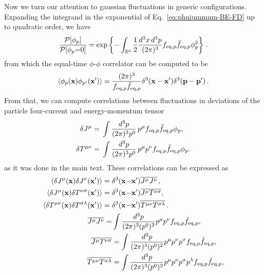 \documentclass[aps,prd,preprint,nofootinbib,amsmath,amssymb,showpacs,longbibliography,singlecolumn,superscriptaddress,10pt]{revtex4-1}
\theoremstyle{plain}
\theoremstyle{definition}
\begin{document}
Now we turn our attention to gaussian fluctuations in generic configurations. Expanding the integrand in the exponential of Eq.~\eqref{eq:phuiummum-BE-FD} up to quadratic order, we have
%
\begin{equation}
\label{eq:gavagringoGauss-FD-BE}    
\begin{aligned}
  \dfrac{\mathcal{P}[\phi_p]}{\mathcal{P}[\phi_p{=}0]} = \exp \left\{ -\int_{\mathbb{R}^6}  \dfrac{1}{2}\dfrac{d^3 x \, d^3p}{(2\pi)^3} f_{\text{eq},p} \Tilde{f}_{\text{eq},p}  \phi^2_p \right\} \, .
\end{aligned}
\end{equation}
%
from which the equal-time $\phi$-$\phi$ correlator can be computed to be
%
\begin{equation}
\label{eq:equaltimecorreltor!}
    \langle \phi_p(\textbf{x})\phi_{p'}(\textbf{x}')\rangle = \dfrac{(2\pi)^3}{f_{\text{eq},p}\Tilde{f}_{\text{eq},p}} \delta^3(\textbf{x}-\textbf{x}')\delta^3(\textbf{p}-\textbf{p}') \, .
\end{equation}
%
From that, we can compute correlations between fluctuations in deviations of the particle four-current and energy-momentum tensor 
%
\begin{equation}
\label{eq:ThedefinitionsFluttuanti-FD-BE}
\begin{split}
    \delta J^{\mu} ={}& \int \frac{d^3p}{(2\pi)^3 p^0} \, p^{\mu} f_{\text{eq},p} \Tilde{f}_{\text{eq},p}\phi_p ,\\
    \delta T^{\mu\nu} ={}& \int \frac{d^3p}{(2\pi)^3 p^0} \, p^{\mu} p^{\nu} f_{\text{eq},p} \Tilde{f}_{\text{eq},p}\phi_p .\\
    \end{split}
\end{equation}
%
as it was done in the main text. These correlations can be expressed as 
%
\begin{equation}
\label{eq:JJ-TT}
\begin{split}
\langle \delta J^\mu(\textbf{x})\delta J^\nu(\textbf{x}')\rangle ={}& \delta^3(\textbf{x}{-}\textbf{x}') \overline{J^\mu J^\nu}  \, , \\
\langle \delta J^\mu(\textbf{x})\delta T^{\nu\sigma}(\textbf{x}')\rangle ={}& \delta^3(\textbf{x}{-}\textbf{x}') \overline{J^\mu T^{\nu \sigma} }  , \\
\langle \delta T^{\mu\nu}(\textbf{x})\delta T^{\sigma \lambda}(\textbf{x}')\rangle ={}& \delta^3(\textbf{x}{-}\textbf{x}') \overline{T^{\mu \nu} T^{\sigma \lambda} }  \, . \\
\overline{J^\mu J^\nu} = & \int \dfrac{d^3p}{(2\pi)^3(p^0)^2} p^\mu p^\nu f_{\text{eq},p} \Tilde{f}_{\text{eq},p} ,
\\
\overline{J^\mu T^{\nu \sigma} } 
&=
\int \dfrac{d^3p}{(2\pi)^3(p^0)^2} p^\mu p^\nu p^\sigma f_{\text{eq},p} \Tilde{f}_{\text{eq},p} , 
\\
\overline{T^{\mu \nu} T^{\sigma \lambda} } 
&=
\int \dfrac{d^3p}{(2\pi)^3(p^0)^2} p^\mu p^\nu p^\sigma p^\lambda f_{\text{eq},p} \Tilde{f}_{\text{eq},p},
\end{split}
\end{equation}
\end{document}
